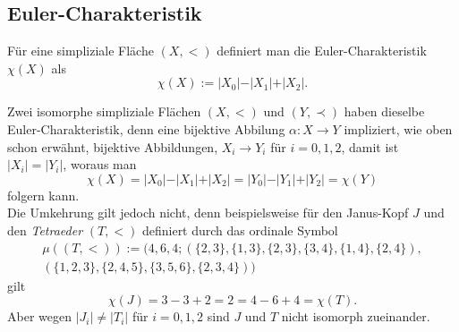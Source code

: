 \documentclass[12pt,titlepage]{article}
\newcommand{\gelb}{0.550000011920929}
\begin{document}
\subsection{Euler-Charakteristik}
\begin{definition}
Für eine simpliziale Fläche $(X,<)$ definiert man die Euler-Charakteristik $\chi(X)$ als
\[
\chi(X) := \vert X_0 \vert - \vert X_1\vert +\vert X_2 \vert.
\]
\end{definition}
\begin{bemerkung}
 Zwei isomorphe simpliziale Flächen $(X,<)$ und $(Y, \prec)$ haben dieselbe Euler-Charakteristik, denn eine bijektive Abbilung $\alpha:X \to Y$ impliziert, wie oben schon erwähnt, bijektive Abbildungen,  $X_i \to Y_i$ für $i=0,1,2$, damit ist $\vert X_i \vert =\vert Y_i \vert $, woraus man
 \[
\chi(X) =\vert X_0 \vert - \vert X_1\vert +\vert X_2 \vert = \vert Y_0 \vert - \vert Y_1\vert +\vert Y_2 \vert =\chi(Y)
 \]
 folgern kann.\\
 Die Umkehrung gilt jedoch nicht, denn beispielsweise für den Janus-Kopf $J$ und den \emph{Tetraeder} $(T,<)$ definiert durch das ordinale Symbol 
 \begin{align*}
 \mu ((T,<)):=(4,6,4;(\{2,3\},\{1,3\},\{2,3\},\{3,4\},\{1,4\},\{2,4\}),\\
 (\{1,2,3\},\{2,4,5\},\{3,5,6\},\{2,3,4\}))
 \end{align*}
 gilt
 \[
\chi(J)=3-3+2=2=4-6+4=\chi(T).
 \]
 Aber wegen $\vert J_i\vert \neq \vert T_i \vert $ für $i=0,1,2$ sind  $J$ und $T$ nicht isomorph zueinander.
 \begin{figure}[h]
\end{figure}
\end{bemerkung}
\end{document}
